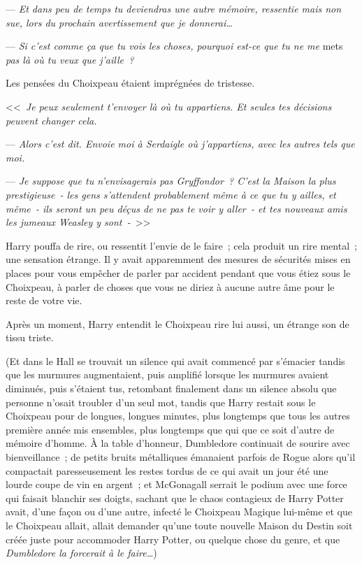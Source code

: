 --- \emph{Et dans peu de temps tu deviendras une autre mémoire, ressentie mais non sue, lors du prochain avertissement que je donnerai…}

--- \emph{Si c'est comme ça que tu vois les choses, pourquoi est-ce que tu ne me} mets \emph{pas là où tu veux que j'aille~?}

Les pensées du Choixpeau étaient imprégnées de tristesse.

<<~\emph{Je peux seulement t'envoyer là où tu appartiens. Et seules tes décisions peuvent changer cela.}

--- \emph{Alors c'est dit. Envoie moi à Serdaigle où j'appartiens, avec les autres tels que moi.}

--- \emph{Je suppose que tu n'envisagerais pas Gryffondor~? C'est la Maison la plus prestigieuse~- les gens s'attendent probablement même à ce que tu y ailles, et même~- ils seront un peu déçus de ne pas te voir y aller~- et tes nouveaux amis les jumeaux Weasley y sont~-}~>>

Harry pouffa de rire, ou ressentit l'envie de le faire~; cela produit un rire mental~; une sensation étrange. Il y avait apparemment des mesures de sécurités mises en places pour vous empêcher de parler par accident pendant que vous étiez sous le Choixpeau, à parler de choses que vous ne diriez à aucune autre âme pour le reste de votre vie.

Après un moment, Harry entendit le Choixpeau rire lui aussi, un étrange son de tissu triste.

(Et dans le Hall se trouvait un silence qui avait commencé par s'émacier tandis que les murmures augmentaient, puis amplifié lorsque les murmures avaient diminués, puis s'étaient tus, retombant finalement dans un silence absolu que personne n'osait troubler d'un seul mot, tandis que Harry restait sous le Choixpeau pour de longues, longues minutes, plus longtemps que tous les autres première année mis ensembles, plus longtemps que qui que ce soit d'autre de mémoire d'homme. À la table d'honneur, Dumbledore continuait de sourire avec bienveillance~; de petits bruits métalliques émanaient parfois de Rogue alors qu'il compactait paresseusement les restes tordus de ce qui avait un jour été une lourde coupe de vin en argent~; et McGonagall serrait le podium avec une force qui faisait blanchir ses doigts, sachant que le chaos contagieux de Harry Potter avait, d'une façon ou d'une autre, infecté le Choixpeau Magique lui-même et que le Choixpeau allait, allait demander qu'une toute nouvelle Maison du Destin soit créée juste pour accommoder Harry Potter, ou quelque chose du genre, et que \emph{Dumbledore la forcerait à le faire…})

